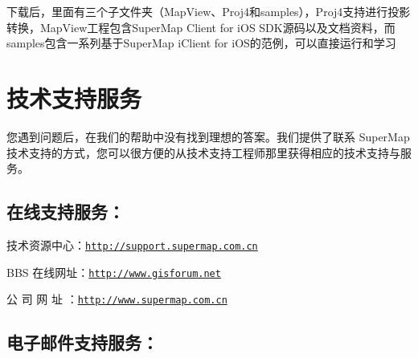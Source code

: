 下载后，里面有三个子文件夹（\-Map\-View、\-Proj4和samples），\-Proj4支持进行投影转换，\-Map\-View工程包含\-Super\-Map Client for i\-O\-S S\-D\-K源码以及文档资料，而samples包含一系列基于\-Super\-Map i\-Client for i\-O\-S的范例，可以直接运行和学习\hypertarget{index_技术支持服务}{}\section{技术支持服务}\label{index_技术支持服务}
您遇到问题后，在我们的帮助中没有找到理想的答案。我们提供了联系 Super\-Map 技术支持的方式，您可以很方便的从技术支持工程师那里获得相应的技术支持与服务。 \hypertarget{index_在线支持服务：}{}\subsection{在线支持服务：}\label{index_在线支持服务：}

\begin{DoxyItemize}
\item 技术资源中心：\href{http://support.supermap.com.cn}{\tt http\-://support.\-supermap.\-com.\-cn}
\item B\-B\-S 在线网址：\href{http://www.gisforum.net}{\tt http\-://www.\-gisforum.\-net}
\item 公 司 网 址 ：\href{http://www.supermap.com.cn}{\tt http\-://www.\-supermap.\-com.\-cn}
\end{DoxyItemize}\hypertarget{index_电子邮件支持服务：}{}\subsection{电子邮件支持服务：}\label{index_电子邮件支持服务：}

